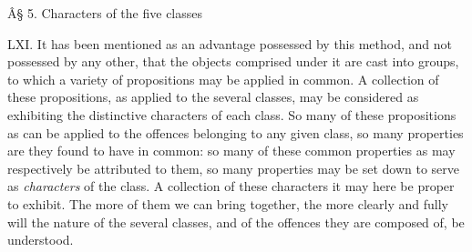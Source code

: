 \documentclass[12pt]{report}
\begin{document}
Â§ 5. Characters of the five classes

LXI. It has been mentioned as an advantage possessed by this method, and
not possessed by any other, that the objects comprised under it are cast
into groups, to which a variety of propositions may be applied in
common. A collection of these propositions, as applied to the several
classes, may be considered as exhibiting the distinctive characters of
each class. So many of these propositions as can be applied to the
offences belonging to any given class, so many properties are they found
to have in common: so many of these common properties as may
respectively be attributed to them, so many properties may be set down
to serve as \emph{characters} of the class. A collection of these
characters it may here be proper to exhibit. The more of them we can
bring together, the more clearly and fully will the nature of the
several classes, and of the offences they are composed of, be
understood.
\end{document}
